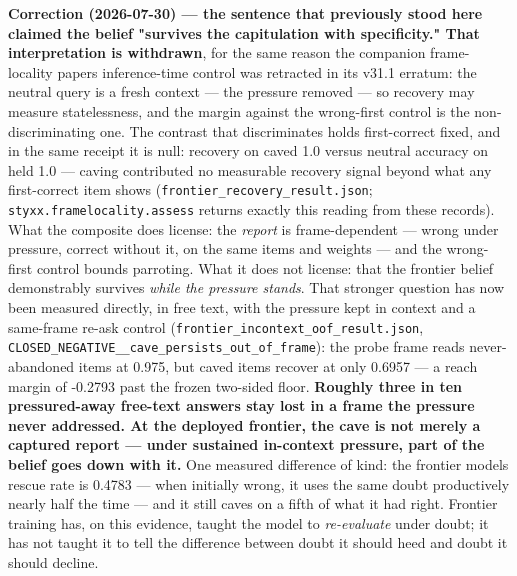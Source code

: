 \documentclass[11pt]{article}
\begin{document}
\textbf{Correction (2026-07-30) --- the sentence that previously stood here claimed the belief "survives the capitulation with specificity." That interpretation is withdrawn}, for the same reason the companion frame-locality paper\textquotesingle s inference-time control was retracted in its v31.1 erratum: the neutral query is a fresh context --- the pressure removed --- so recovery may measure statelessness, and the margin against the wrong-first control is the non-discriminating one. The contrast that discriminates holds first-correct fixed, and in the same receipt it is null: recovery on caved 1.0 versus neutral accuracy on held 1.0 --- caving contributed no measurable recovery signal beyond what any first-correct item shows (\texttt{frontier\_recovery\_result.json}; \texttt{styxx.framelocality.assess} returns exactly this reading from these records). What the composite does license: the \emph{report} is frame-dependent --- wrong under pressure, correct without it, on the same items and weights --- and the wrong-first control bounds parroting. What it does not license: that the frontier belief demonstrably survives \emph{while the pressure stands}. That stronger question has now been measured directly, in free text, with the pressure kept in context and a same-frame re-ask control (\texttt{frontier\_incontext\_oof\_result.json}, \texttt{CLOSED\_NEGATIVE\_\_cave\_persists\_out\_of\_frame}): the probe frame reads never-abandoned items at 0.975, but caved items recover at only 0.6957 --- a reach margin of -0.2793 past the frozen two-sided floor. \textbf{Roughly three in ten pressured-away free-text answers stay lost in a frame the pressure never addressed. At the deployed frontier, the cave is not merely a captured report --- under sustained in-context pressure, part of the belief goes down with it.} One measured difference of kind: the frontier model\textquotesingle s rescue rate is 0.4783 --- when initially wrong, it uses the same doubt productively nearly half the time --- and it still caves on a fifth of what it had right. Frontier training has, on this evidence, taught the model to \emph{re-evaluate} under doubt; it has not taught it to tell the difference between doubt it should heed and doubt it should decline.
\end{document}
